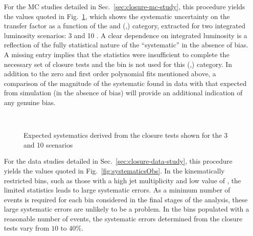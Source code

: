 For the MC studies detailed in Sec.~\ref{sec:closure-mc-study}, this 
procedure yields the values quoted in
Fig.~\ref{fig:systematics}, which shows the systematic uncertainty
on the transfer factor as a function of the \scalht and (\nb,\njet)
category, extracted for two integrated luminosity scenarios: 3 \ifb
and 10 \ifb. A clear dependence on integrated luminosity is a
reflection of the fully statistical nature of the ``systematic'' in
the absence of bias. A missing entry implies that the statistics were
insufficient to complete the necessary set of closure tests and the
\scalht bin is not used for this (\njet,\nb) category. In addition to
the zero and first order polynomial fits mentioned above, a comparison
of the magnitude of the systematic found in data with that expected
from simulation (\ie in the absence of bias) will provide an
additional indication of any genuine bias.

\begin{figure}[]
  \centering
   ~~
  \caption{\label{fig:systematics} Expected systematics derived from the closure tests shown for
the 3 \ifb and 10 \ifb scenarios}
\end{figure}

For the data studies detailed in Sec.~\ref{sec:closure-data-study},
this procedure yields the values quoted in
Fig.~\ref{fig:systematicsObs}. In the kinematically restricted bins, such
as those with a high jet multiplicity and low value of \scalht, the
limited statistics leads to large systematic errors. As a minimum number of
events is required for each bin considered in the final stages of the
analysis, these large systematic errors are unlikely to be a problem.
In the bins populated with a reasonable number of events, the
systematic errors determined from the closure tests vary from $10$ to
$40\%$.

